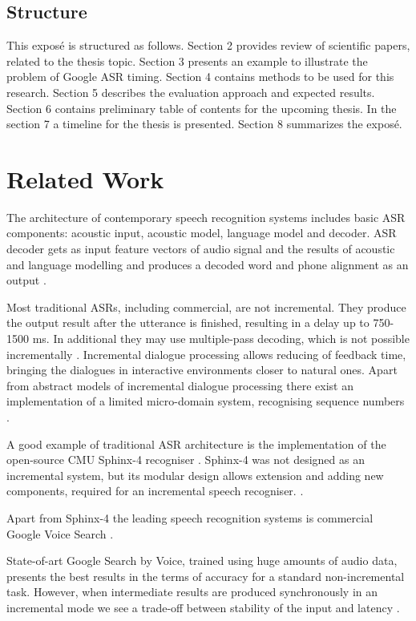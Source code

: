 \subsection {Structure}
This expos\'{e} is structured as follows. Section 2 provides review of 
scientific papers, related to the thesis topic. %
Section 3 presents an example to illustrate the
problem of Google ASR timing. Section 4 contains methods to be used for this
research.
Section 5 describes the evaluation approach and expected results. Section 6
contains preliminary table of contents for the upcoming thesis. In the section 7
a timeline for the thesis is presented. Section 8 summarizes the expos\'{e}.

\section {Related Work}
The architecture of  contemporary speech recognition systems includes basic ASR
components: acoustic input, acoustic model, language model and decoder.
ASR decoder gets as input feature vectors of audio signal and the results
of acoustic and language modelling and produces a decoded word and
phone alignment as an output \parencite {jurafskymartin2009}.

Most traditional ASRs, including commercial, are not incremental. They produce
the output result after the utterance is finished, resulting in a delay up to
750-1500 ms. In additional they may use multiple-pass decoding, which is not
possible incrementally \parencite {skantzeschlangen2009}.
Incremental dialogue processing allows reducing of feedback time, bringing the
dialogues in interactive environments closer to natural ones.
Apart from abstract models of incremental dialogue processing there exist an
implementation  of a limited micro-domain system, recognising sequence
numbers \parencite {skantzeschlangen2009}.

A good example of  traditional ASR architecture is the implementation of the
open-source CMU Sphinx-4 recogniser \parencite {Lamereetal2013:Eurospeech}.
Sphinx-4 was not designed as an incremental system, but its modular design 
allows extension and adding new components, required for an incremental speech recogniser. 
\parencite {baumannetal2009:naacl}.

Apart from Sphinx-4 the leading speech recognition systems is commercial
Google Voice Search \parencite{schalkwyk2010}.

State-of-art Google Search by Voice, trained using huge amounts of audio data,
presents the best results in the terms of accuracy for a
standard non-incremental task. However, when intermediate results are produced
synchronously in an incremental mode we see a trade-off between stability of the
input and latency \parencite {mcgrawgrauenstein2012}. 


